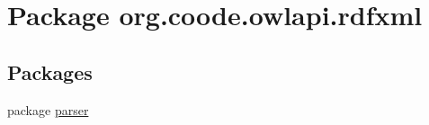 \hypertarget{namespaceorg_1_1coode_1_1owlapi_1_1rdfxml}{\section{Package org.\-coode.\-owlapi.\-rdfxml}
\label{namespaceorg_1_1coode_1_1owlapi_1_1rdfxml}
}
\subsection*{Packages}
\begin{DoxyCompactItemize}
\item 
package \hyperlink{namespaceorg_1_1coode_1_1owlapi_1_1rdfxml_1_1parser}{parser}
\end{DoxyCompactItemize}
